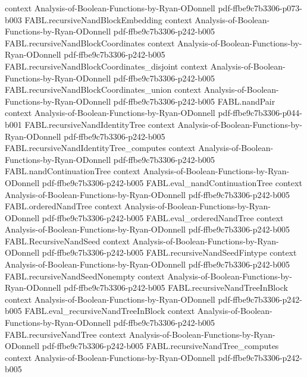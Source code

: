 \begin{theorem}
  {context}
  {Analysis-of-Boolean-Functions-by-Ryan-ODonnell}
  {pdf-ffbe9c7b3306-p073-b003}
\proofstep
  {FABL.recursiveNandBlockEmbedding}
  {context}
  {Analysis-of-Boolean-Functions-by-Ryan-ODonnell}
  {pdf-ffbe9c7b3306-p242-b005}
\proofstep
  {FABL.recursiveNandBlockCoordinates}
  {context}
  {Analysis-of-Boolean-Functions-by-Ryan-ODonnell}
  {pdf-ffbe9c7b3306-p242-b005}
\proofstep
  {FABL.recursiveNandBlockCoordinates_disjoint}
  {context}
  {Analysis-of-Boolean-Functions-by-Ryan-ODonnell}
  {pdf-ffbe9c7b3306-p242-b005}
\proofstep
  {FABL.recursiveNandBlockCoordinates_union}
  {context}
  {Analysis-of-Boolean-Functions-by-Ryan-ODonnell}
  {pdf-ffbe9c7b3306-p242-b005}
\proofstep
  {FABL.nandPair}
  {context}
  {Analysis-of-Boolean-Functions-by-Ryan-ODonnell}
  {pdf-ffbe9c7b3306-p044-b001}
\proofstep
  {FABL.recursiveNandIdentityTree}
  {context}
  {Analysis-of-Boolean-Functions-by-Ryan-ODonnell}
  {pdf-ffbe9c7b3306-p242-b005}
\proofstep
  {FABL.recursiveNandIdentityTree_computes}
  {context}
  {Analysis-of-Boolean-Functions-by-Ryan-ODonnell}
  {pdf-ffbe9c7b3306-p242-b005}
\proofstep
  {FABL.nandContinuationTree}
  {context}
  {Analysis-of-Boolean-Functions-by-Ryan-ODonnell}
  {pdf-ffbe9c7b3306-p242-b005}
\proofstep
  {FABL.eval_nandContinuationTree}
  {context}
  {Analysis-of-Boolean-Functions-by-Ryan-ODonnell}
  {pdf-ffbe9c7b3306-p242-b005}
\proofstep
  {FABL.orderedNandTree}
  {context}
  {Analysis-of-Boolean-Functions-by-Ryan-ODonnell}
  {pdf-ffbe9c7b3306-p242-b005}
\proofstep
  {FABL.eval_orderedNandTree}
  {context}
  {Analysis-of-Boolean-Functions-by-Ryan-ODonnell}
  {pdf-ffbe9c7b3306-p242-b005}
\proofstep
  {FABL.RecursiveNandSeed}
  {context}
  {Analysis-of-Boolean-Functions-by-Ryan-ODonnell}
  {pdf-ffbe9c7b3306-p242-b005}
\proofstep
  {FABL.recursiveNandSeedFintype}
  {context}
  {Analysis-of-Boolean-Functions-by-Ryan-ODonnell}
  {pdf-ffbe9c7b3306-p242-b005}
\proofstep
  {FABL.recursiveNandSeedNonempty}
  {context}
  {Analysis-of-Boolean-Functions-by-Ryan-ODonnell}
  {pdf-ffbe9c7b3306-p242-b005}
\proofstep
  {FABL.recursiveNandTreeInBlock}
  {context}
  {Analysis-of-Boolean-Functions-by-Ryan-ODonnell}
  {pdf-ffbe9c7b3306-p242-b005}
\proofstep
  {FABL.eval_recursiveNandTreeInBlock}
  {context}
  {Analysis-of-Boolean-Functions-by-Ryan-ODonnell}
  {pdf-ffbe9c7b3306-p242-b005}
\proofstep
  {FABL.recursiveNandTree}
  {context}
  {Analysis-of-Boolean-Functions-by-Ryan-ODonnell}
  {pdf-ffbe9c7b3306-p242-b005}
\proofstep
  {FABL.recursiveNandTree_computes}
  {context}
  {Analysis-of-Boolean-Functions-by-Ryan-ODonnell}
  {pdf-ffbe9c7b3306-p242-b005}

\end{theorem}
